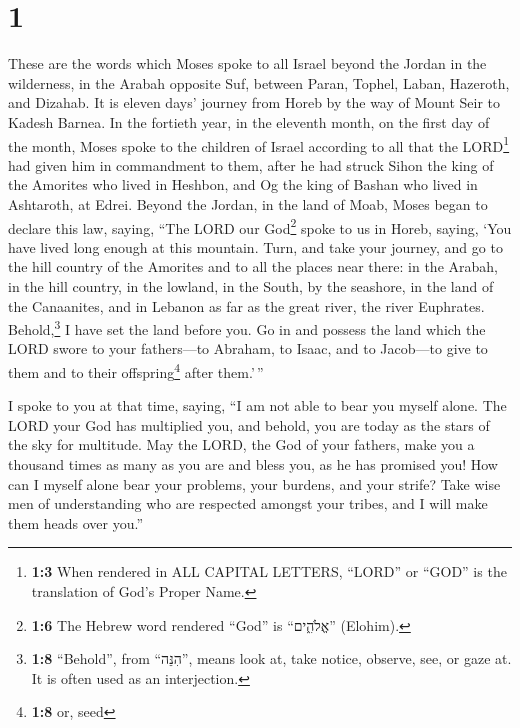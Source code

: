 \hypertarget{section}{%
\section{1}\label{section}}

 These are the words which Moses spoke to all Israel
beyond the Jordan in the wilderness, in the Arabah opposite Suf, between
Paran, Tophel, Laban, Hazeroth, and Dizahab.  It is eleven
days' journey from Horeb by the way of Mount Seir to Kadesh Barnea.
 In the fortieth year, in the eleventh month, on the first
day of the month, Moses spoke to the children of Israel according to all
that the LORD\footnote{\textbf{1:3} When rendered in ALL CAPITAL
  LETTERS, ``LORD'' or ``GOD'' is the translation of God's Proper Name.}
had given him in commandment to them,  after he had struck
Sihon the king of the Amorites who lived in Heshbon, and Og the king of
Bashan who lived in Ashtaroth, at Edrei.  Beyond the
Jordan, in the land of Moab, Moses began to declare this law, saying,
 ``The LORD our God\footnote{\textbf{1:6} The Hebrew word
  rendered ``God'' is ``אֱלֹהִ֑ים'' (Elohim).} spoke to us in Horeb,
saying, `You have lived long enough at this mountain. 
Turn, and take your journey, and go to the hill country of the Amorites
and to all the places near there: in the Arabah, in the hill country, in
the lowland, in the South, by the seashore, in the land of the
Canaanites, and in Lebanon as far as the great river, the river
Euphrates.  Behold,\footnote{\textbf{1:8} ``Behold'', from
  ``הִנֵּה'', means look at, take notice, observe, see, or gaze at. It
  is often used as an interjection.} I have set the land before you. Go
in and possess the land which the LORD swore to your fathers---to
Abraham, to Isaac, and to Jacob---to give to them and to their
offspring\footnote{\textbf{1:8} or, seed} after them.'\,''

 I spoke to you at that time, saying, ``I am not able to
bear you myself alone.  The LORD your God has multiplied
you, and behold, you are today as the stars of the sky for multitude.
 May the LORD, the God of your fathers, make you a
thousand times as many as you are and bless you, as he has promised you!
 How can I myself alone bear your problems, your burdens,
and your strife?  Take wise men of understanding who are
respected amongst your tribes, and I will make them heads over you.''

